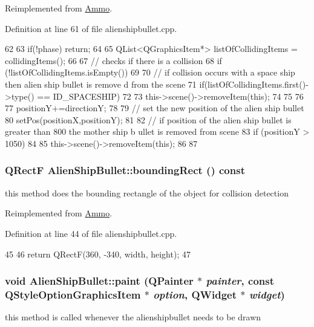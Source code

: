 Reimplemented from \hyperlink{class_ammo_a257fb0cdbb4302da65b89447fa6caeaa}{Ammo}.

Definition at line 61 of file alienshipbullet.cpp.


\begin{DoxyCode}
62 {
63     if(!phase) return;
64 
65     QList<QGraphicsItem*> listOfCollidingItems = collidingItems();
66 
67     // checks if there is a collision
68     if (!listOfCollidingItems.isEmpty())
69     {
70         // if collision occurs with a space ship then alien ship bullet is remove
      d from the scene
71         if(listOfCollidingItems.first()->type() == ID_SPACESHIP)
72         {
73             this->scene()->removeItem(this);
74         }
75     }
76 
77     positionY+=directionY;
78 
79     // set the new position of the alien ship bullet
80     setPos(positionX,positionY);
81 
82     // if position of the alien ship bullet is greater than 800 the mother ship b
      ullet is removed from scene
83     if (positionY > 1050)
84     {
85         this->scene()->removeItem(this);
86     }
87 }
\end{DoxyCode}
\hypertarget{class_alien_ship_bullet_a0a7aa5b5707281f2d204f903650df560}{
\subsubsection[{boundingRect}]{\setlength{\rightskip}{0pt plus 5cm}QRectF AlienShipBullet::boundingRect () const}}
\label{class_alien_ship_bullet_a0a7aa5b5707281f2d204f903650df560}
this method does the bounding rectangle of the object for collision detection 

Reimplemented from \hyperlink{class_ammo_a4c5548e35a4599210f0599328ef03f01}{Ammo}.

Definition at line 44 of file alienshipbullet.cpp.


\begin{DoxyCode}
45 {
46   return QRectF(360, -340, width, height);
47 }
\end{DoxyCode}
\hypertarget{class_alien_ship_bullet_a24f6404671b0e0ef258a8d7814ead18b}{
\subsubsection[{paint}]{\setlength{\rightskip}{0pt plus 5cm}void AlienShipBullet::paint (QPainter $\ast$ {\em painter}, \/  const QStyleOptionGraphicsItem $\ast$ {\em option}, \/  QWidget $\ast$ {\em widget})}}
\label{class_alien_ship_bullet_a24f6404671b0e0ef258a8d7814ead18b}
this method is called whenever the alienshipbullet needs to be drawn 

